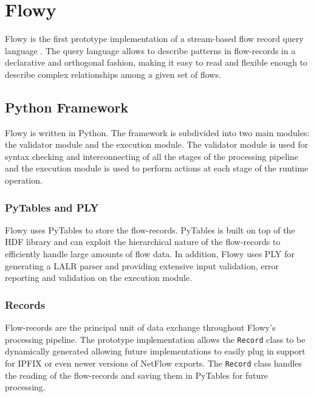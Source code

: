 \chapter{Flowy}\label{ch:flowy-design}

Flowy \cite{kkanev:thesis:2009}\cite{kkanev:2010} is the first prototype implementation of a stream-based flow record query language \cite{vmarinov:thesis:2009}\cite{vmarinov:2009}\cite{vmarinov:2008}. The query language allows to describe patterns in flow-records in a declarative and orthogonal fashion, making it easy to read and flexible enough to describe complex relationships among a given set of flows. 

\section{Python Framework}\label{sec:python-framework}
Flowy is written in Python. The framework is subdivided into two main modules: the validator module and the execution module. The validator module is used for syntax checking and interconnecting of all the stages of the processing pipeline and the execution module is used to perform actions at each stage of the runtime operation. 

\subsection{PyTables and PLY}\label{subsec:pytable-ply}
Flowy uses PyTables \cite{falted:2003} to store the flow-records. PyTables is built on top of the \ac{HDF} library and can exploit the hierarchical nature of the flow-records to efficiently handle large amounts of flow data. In addition, Flowy uses \ac{PLY} for generating a \ac{LALR} parser and providing extensive input validation, error reporting and validation on the execution module.

\subsection{Records}\label{subsec:records}
Flow-records are the principal unit of data exchange throughout Flowy's processing pipeline. The prototype implementation allows the \texttt{Record} class to be dynamically generated allowing future implementations to easily plug in support for \ac{IPFIX} or even newer versions of NetFlow \cite{rfc3954} exports. The \texttt{Record} class handles the reading of the flow-records and saving them in PyTables for future processing.

